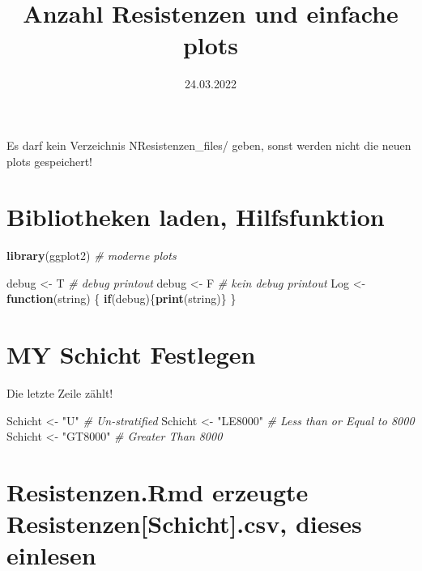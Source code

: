 \documentclass[
]{article}
\title{Anzahl Resistenzen und einfache plots}
\author{}
\date{\vspace{-2.5em}24.03.2022}
\newenvironment{Shaded}{\begin{snugshade}}{\end{snugshade}}
\newcommand{\CommentTok}[1]{\textcolor[rgb]{0.56,0.35,0.01}{\textit{#1}}}
\newcommand{\ControlFlowTok}[1]{\textcolor[rgb]{0.13,0.29,0.53}{\textbf{#1}}}
\newcommand{\KeywordTok}[1]{\textcolor[rgb]{0.13,0.29,0.53}{\textbf{#1}}}
\newcommand{\NormalTok}[1]{#1}
\newcommand{\StringTok}[1]{\textcolor[rgb]{0.31,0.60,0.02}{#1}}
\begin{document}
\maketitle

Es darf kein Verzeichnis NResistenzen\_files/ geben, sonst werden nicht
die neuen plots gespeichert!

\hypertarget{bibliotheken-laden-hilfsfunktion}{%
\section{Bibliotheken laden,
Hilfsfunktion}\label{bibliotheken-laden-hilfsfunktion}}

\begin{Shaded}
\begin{Highlighting}[]
\KeywordTok{library}\NormalTok{(ggplot2)     }\CommentTok{# moderne plots}

\NormalTok{debug <-}\StringTok{ }\NormalTok{T           }\CommentTok{# debug printout}
\NormalTok{debug <-}\StringTok{ }\NormalTok{F           }\CommentTok{# kein debug printout}
\NormalTok{Log <-}\StringTok{ }\ControlFlowTok{function}\NormalTok{(string) \{}
  \ControlFlowTok{if}\NormalTok{(debug)\{}\KeywordTok{print}\NormalTok{(string)\}  }
\NormalTok{\}}
\end{Highlighting}
\end{Shaded}

\hypertarget{my-schicht-festlegen}{%
\section{MY Schicht Festlegen}\label{my-schicht-festlegen}}

Die letzte Zeile zählt!

\begin{Shaded}
\begin{Highlighting}[]
\NormalTok{Schicht <-}\StringTok{ "U"}         \CommentTok{# Un-stratified}
\NormalTok{Schicht <-}\StringTok{ "LE8000"}    \CommentTok{# Less than or Equal to 8000}
\NormalTok{Schicht <-}\StringTok{ "GT8000"}    \CommentTok{# Greater Than 8000}
\end{Highlighting}
\end{Shaded}

\hypertarget{resistenzen.rmd-erzeugte-resistenzenschicht.csv-dieses-einlesen}{%
\section{Resistenzen.Rmd erzeugte Resistenzen{[}Schicht{]}.csv, dieses
einlesen}\label{resistenzen.rmd-erzeugte-resistenzenschicht.csv-dieses-einlesen}}
\end{document}
